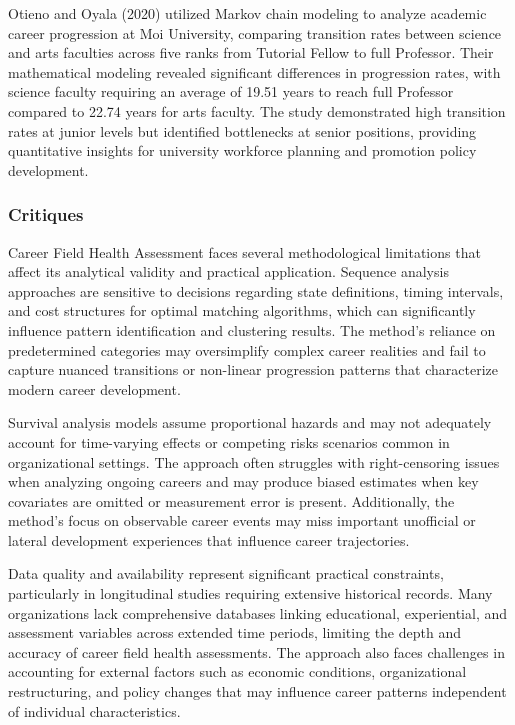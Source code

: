 \documentclass[main.tex]{subfiles}
\begin{document}
Otieno and Oyala (2020) utilized Markov chain modeling to analyze academic career progression at Moi University, comparing transition rates between science and arts faculties across five ranks from Tutorial Fellow to full Professor. Their mathematical modeling revealed significant differences in progression rates, with science faculty requiring an average of 19.51 years to reach full Professor compared to 22.74 years for arts faculty. The study demonstrated high transition rates at junior levels but identified bottlenecks at senior positions, providing quantitative insights for university workforce planning and promotion policy development\cite{otieno2020}.

\subsubsection{Critiques}

Career Field Health Assessment faces several methodological limitations that affect its analytical validity and practical application. Sequence analysis approaches are sensitive to decisions regarding state definitions, timing intervals, and cost structures for optimal matching algorithms, which can significantly influence pattern identification and clustering results. The method's reliance on predetermined categories may oversimplify complex career realities and fail to capture nuanced transitions or non-linear progression patterns that characterize modern career development.

Survival analysis models assume proportional hazards and may not adequately account for time-varying effects or competing risks scenarios common in organizational settings. The approach often struggles with right-censoring issues when analyzing ongoing careers and may produce biased estimates when key covariates are omitted or measurement error is present\cite{hoglin2004}. Additionally, the method's focus on observable career events may miss important unofficial or lateral development experiences that influence career trajectories.

Data quality and availability represent significant practical constraints, particularly in longitudinal studies requiring extensive historical records. Many organizations lack comprehensive databases linking educational, experiential, and assessment variables across extended time periods, limiting the depth and accuracy of career field health assessments. The approach also faces challenges in accounting for external factors such as economic conditions, organizational restructuring, and policy changes that may influence career patterns independent of individual characteristics\cite{joseph2012}.
\end{document}

